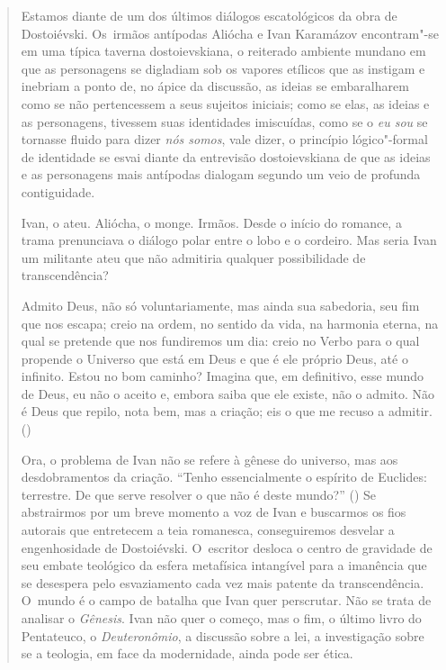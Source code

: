 {\begin{quote}
Estamos diante de um dos últimos diálogos escatológicos da obra de
Dostoiévski. Os~irmãos antípodas Aliócha e Ivan Karamázov encontram"-se
em uma típica taverna dostoievskiana, o reiterado ambiente mundano em
que as personagens se digladiam sob os vapores etílicos que as instigam
e inebriam a ponto de, no ápice da discussão, as ideias se embaralharem
como se não pertencessem a seus sujeitos iniciais; como se elas, as
ideias e as personagens, tivessem suas identidades imiscuídas, como se o
\emph{eu sou} se tornasse fluido para dizer \emph{nós somos}, vale
dizer, o princípio lógico"-formal de identidade se esvai diante da
entrevisão dostoievskiana de que as ideias e as personagens mais
antípodas dialogam segundo um veio de profunda contiguidade.

Ivan, o ateu. Aliócha, o monge. Irmãos. Desde o início do romance, a
trama prenunciava o diálogo polar entre o lobo e o cordeiro. Mas seria
Ivan um militante ateu que não admitiria qualquer possibilidade de
transcendência?

Admito Deus, não só voluntariamente, mas ainda sua sabedoria, seu fim
que nos escapa; creio na ordem, no sentido da vida, na harmonia eterna,
na qual se pretende que nos fundiremos um dia: creio no Verbo para o
qual propende o Universo que está em Deus e que é ele próprio Deus, até
o infinito. Estou no bom caminho? Imagina que, em definitivo, esse mundo
de Deus, eu não o aceito e, embora saiba que ele existe, não o admito.
Não é Deus que repilo, nota bem, mas a criação; eis o que me recuso a
admitir. ()

Ora, o problema de Ivan não se refere à gênese do universo, mas aos
desdobramentos da criação. ``Tenho essencialmente o espírito de
Euclides: terrestre. De que serve resolver o que não é deste mundo?''
() Se abstrairmos por um breve momento a voz de Ivan e buscarmos
os fios autorais que entretecem a teia romanesca, conseguiremos desvelar
a engenhosidade de Dostoiévski. O~escritor desloca o centro de gravidade
de seu embate teológico da esfera metafísica intangível para a imanência
que se desespera pelo esvaziamento cada vez mais patente da
transcendência. O~mundo é o campo de batalha que Ivan quer perscrutar.
Não se trata de analisar o \emph{Gênesis}. Ivan não quer o começo, mas o
fim, o último livro do Pentateuco, o \emph{Deuteronômio}, a discussão
sobre a lei, a investigação sobre se a teologia, em face da modernidade,
ainda pode ser ética.


\end{quote}}
